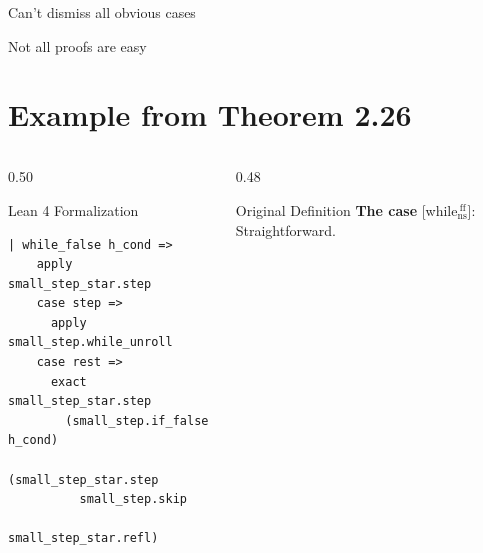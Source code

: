 \documentclass[xcolor={dvipsnames,table}]{beamer}
\begin{document}
\begin{frame}[fragile]{Can't dismiss all obvious cases}
\end{frame}

\begin{frame}[fragile]{Not all proofs are easy}
\section*{Example from Theorem 2.26}
    \begin{columns}[T]
        
        \begin{column}{0.50\textwidth}
            \begin{block}{Lean 4 Formalization}
                \begin{lstlisting}[style=lean4, basicstyle=\scriptsize\ttfamily]
  | while_false h_cond =>
    apply small_step_star.step
    case step =>
      apply small_step.while_unroll
    case rest =>
      exact small_step_star.step
        (small_step.if_false h_cond)
        (small_step_star.step
          small_step.skip
          small_step_star.refl)
                \end{lstlisting}
            \end{block}
        \end{column}

        \begin{column}{0.48\textwidth}
            \begin{block}{Original Definition}
\vspace{1em}
\scriptsize
\textbf{The case} [while$_{\text{ns}}^{\ \text{ff}}$]: Straightforward.
            \end{block}
        \end{column}
    \end{columns}
\end{frame}
\end{document}
